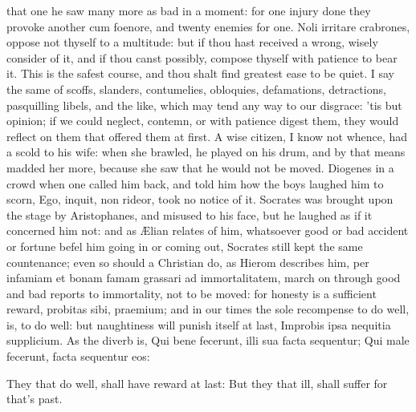 {that one he saw many more as bad in a moment: for one injury done they
provoke another cum foenore, and twenty enemies for one. Noli irritare
crabrones, oppose not thyself to a multitude: but if thou hast received
a wrong, wisely consider of it, and if thou canst possibly, compose
thyself with patience to bear it. This is the safest course, and thou
shalt find greatest ease to be quiet.
I say the same of scoffs, slanders, contumelies, obloquies,
defamations, detractions, pasquilling libels, and the like, which may
tend any way to our disgrace: 'tis but opinion; if we could neglect,
contemn, or with patience digest them, they would reflect on them that
offered them at first. A wise citizen, I know not whence, had a scold
to his wife: when she brawled, he played on his drum, and by that means
madded her more, because she saw that he would not be moved. Diogenes
in a crowd when one called him back, and told him how the boys laughed
him to scorn, Ego, inquit, non rideor, took no notice of it. Socrates
was brought upon the stage by Aristophanes, and misused to his face,
but he laughed as if it concerned him not: and as \AE{}lian relates of
him, whatsoever good or bad accident or fortune befel him going in or
coming out, Socrates still kept the same countenance; even so should a
Christian do, as Hierom describes him, per infamiam et bonam famam
grassari ad immortalitatem, march on through good and bad reports to
immortality, not to be moved: for honesty is a sufficient reward,
probitas sibi, praemium; and in our times the sole recompense to do
well, is, to do well: but naughtiness will punish itself at last,
Improbis ipsa nequitia supplicium. As the diverb is,
Qui bene fecerunt, illi sua facta sequentur;
Qui male fecerunt, facta sequentur eos:

They that do well, shall have reward at last:
But they that ill, shall suffer for that's past.

}
